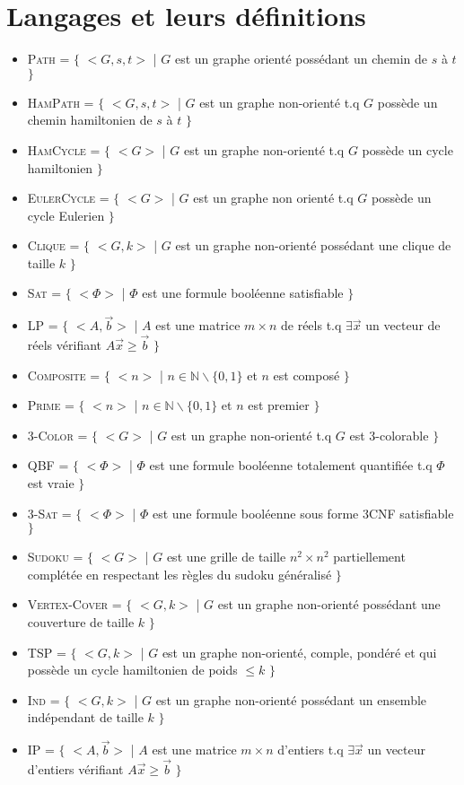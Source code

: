 \documentclass[a4paper,11pt]{report}
\newcommand{\languageDef}[3]{\textsc{#1} = $\{$ #2 | #3 $\}$}
\begin{document}
\section{Langages et leurs définitions}
\begin{itemize}
\item \languageDef{Path}{$<G,s,t>$}{$G$ est un graphe orienté possédant un chemin de $s$ à $t$}
\item \languageDef{HamPath}{$<G,s,t>$}{$G$ est un graphe non-orienté t.q $G$ possède un chemin hamiltonien de $s$ à $t$}
\item \languageDef{HamCycle}{$<G>$}{$G$ est un graphe non-orienté t.q $G$ possède un cycle hamiltonien}
\item \languageDef{EulerCycle}{$<G>$}{$G$ est un graphe non orienté t.q $G$ possède un cycle Eulerien}
\item \languageDef{Clique}{$<G,k>$}{$G$ est un graphe non-orienté possédant une clique de taille $k$}
\item \languageDef{Sat}{$<\Phi>$}{$\Phi$ est une formule booléenne satisfiable}
\item \languageDef{LP}{$<A,\overset{\rightarrow}{b}>$}{$A$ est une matrice $m \times n$ de réels t.q $\exists \overset{\rightarrow}{x}$ un vecteur de réels vérifiant $A\overset{\rightarrow}{x} \ge \overset{\rightarrow}{b}$}
\item \languageDef{Composite}{$<n>$}{$n \in \mathbb{N} \backslash \{0,1\}$ et $n$ est composé}
\item \languageDef{Prime}{$<n>$}{$n \in \mathbb{N} \backslash \{0,1\}$ et $n$ est premier}
\item \languageDef{3-Color}{$<G>$}{$G$ est un graphe non-orienté t.q $G$ est 3-colorable}
\item \languageDef{QBF}{$<\Phi>$}{$\Phi$ est une formule booléenne totalement quantifiée t.q $\Phi$ est vraie}
\item \languageDef{3-Sat}{$<\Phi>$}{$\Phi$ est une formule booléenne sous forme 3CNF satisfiable}
\item \languageDef{Sudoku}{$<G>$}{$G$ est une grille de taille $n^2 \times n^2$ partiellement complétée en respectant les règles du sudoku généralisé}
\item \languageDef{Vertex-Cover}{$<G,k>$}{$G$ est un graphe non-orienté possédant une couverture de taille $k$}
\item \languageDef{TSP}{$<G,k>$}{$G$ est un graphe non-orienté, comple, pondéré et qui possède un cycle hamiltonien de poids $\le k$}
\item \languageDef{Ind}{$<G,k>$}{$G$ est un graphe non-orienté possédant un ensemble indépendant de taille $k$}
\item \languageDef{IP}{$<A,\overset{\rightarrow}{b}>$}{$A$ est une matrice $m \times n$ d'entiers t.q $\exists \overset{\rightarrow}{x}$ un vecteur d'entiers vérifiant $A\overset{\rightarrow}{x} \ge \overset{\rightarrow}{b}$}

\end{itemize}
\end{document}

